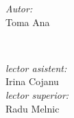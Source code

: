 \documentclass[12pt,a4paper,titlepage]{article}
\begin{document}
\begin{titlepage}
\begin{center}
      \begin{minipage}{0.4\textwidth}
      \begin{flushleft} \large
      \emph{Autor:}\\
      Toma {Ana}
      \end{flushleft}
      \end{minipage}
      ~
      \begin{minipage}{0.4\textwidth}
      \begin{flushright} \large
      \emph{lector asistent:} \\
      Irina {Cojanu} \\ 
      \emph{lector superior:} \\
      Radu {Melnic} %
      \end{flushright}
      \end{minipage}\\[4cm]

      \vspace{5 mm}






      \vfill %
      \end{center}
      
\end{titlepage}
   
\end{document}
